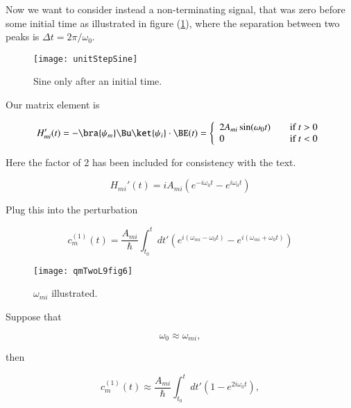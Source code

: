 Now we want to consider instead a non-terminating signal, that was zero before some initial time as illustrated in figure (\ref{fig:unitStepSine}), where the separation between two peaks is $\Delta t = 2\pi/\omega_0$.

\begin{figure}[htp]
\centering
\texttt{[image: unitStepSine]}
\caption{Sine only after an initial time.}\label{fig:unitStepSine}
\end{figure}

Our matrix element is 

\begin{equation}\label{eqn:qmTwoL9:470}
H_{mi}'(t) = - \bra{\psi_m} \Bu \ket{\psi_i} \cdot \BE(t) = 
\left\{
\begin{array}{l l}
2 A_{mi} \sin(\omega_0 t) & \quad \mbox{if $t > 0$} \\
0 & \quad \mbox{if $t < 0$} \\
\end{array}
\right.
\end{equation}

Here the factor of 2 has been included for consistency with the text.

\begin{equation}\label{eqn:qmTwoL9:490}
H_{mi}'(t) = i A_{mi} 
\left( 
e^{-i \omega_0 t}
-e^{i \omega_0 t} 
\right)
\end{equation}

Plug this into the perturbation

\begin{equation}\label{eqn:qmTwoL9:510}
c_m^{(1)}(t) = 
\frac{A_{mi}}{\hbar} \int_{t_0}^t dt' 
\left( 
e^{i (\omega_{mi} - \omega_0 t) }
-e^{i (\omega_{mi} + \omega_0 t) }
\right)
\end{equation}

\begin{figure}[htp]
\centering
\texttt{[image: qmTwoL9fig6]}
\caption{$\omega_{mi}$ illustrated.}\label{fig:qmTwoL9fig6}
\end{figure}

Suppose that

\begin{equation}\label{eqn:qmTwoL9:530}
\omega_0 \approx \omega_{mi},
\end{equation}

then

\begin{equation}\label{eqn:qmTwoL9:550}
c_m^{(1)}(t) \approx
\frac{A_{mi}}{\hbar} \int_{t_0}^t dt' 
\left( 
1
-e^{2 i \omega_0 t }
\right),
\end{equation}

